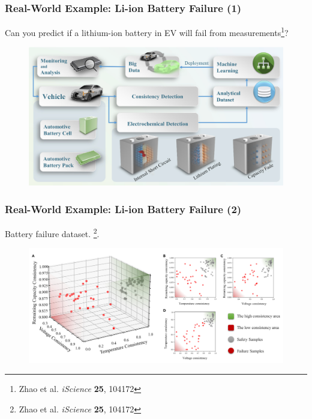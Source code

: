 \documentclass[10pt,aspectratio=169]{beamer}
\begin{document}
      \begin{frame}
        \frametitle{Real-World Example: Li-ion Battery Failure (1)}

        Can you predict if a lithium-ion battery in EV will fail from
        measurements\let\thefootnote\relax\footnote{{\tiny Zhao et
            al. \textit{iScience} \textbf{25}, 104172}}?

        \begin{figure}[t]
          \includegraphics[width=0.9\linewidth]{images/battery_1.png}
        \end{figure}

      \end{frame}

      \begin{frame}
        \frametitle{Real-World Example: Li-ion Battery Failure (2)}
        Battery failure
        dataset. \let\thefootnote\relax\footnote{{\tiny Zhao et
            al. \textit{iScience} \textbf{25}, 104172}}.

        \begin{figure}[t]
          \includegraphics[width=1.0\linewidth]{images/battery_2.png}
        \end{figure}
      \end{frame}
\end{document}
